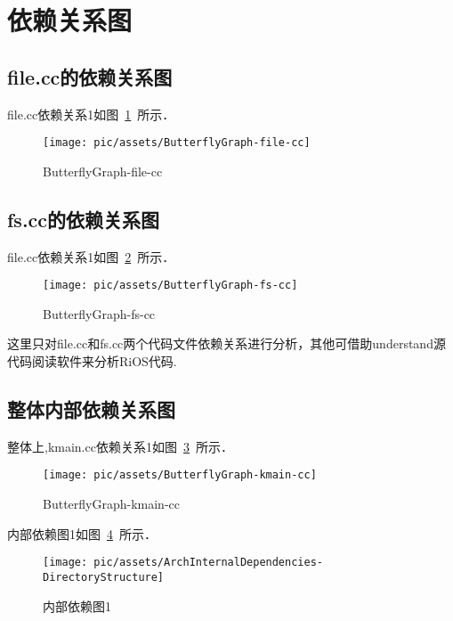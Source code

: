 \section{依赖关系图}

\subsection{file.cc的依赖关系图}
file.cc依赖关系1如图~\ref{ButterflyGraph-file-cc}~所示．	

     \begin{figure}[!htbp]
            \centering	\texttt{[image: pic/assets/ButterflyGraph-file-cc]}
            \caption{ButterflyGraph-file-cc}	\label{ButterflyGraph-file-cc}	\end{figure} 
          

\subsection{fs.cc的依赖关系图}
file.cc依赖关系1如图~\ref{ButterflyGraph-fs-cc}~所示．	

     \begin{figure}[!htbp]
            \centering	\texttt{[image: pic/assets/ButterflyGraph-fs-cc]}
            \caption{ButterflyGraph-fs-cc}	\label{ButterflyGraph-fs-cc}	\end{figure} 

这里只对file.cc和fs.cc两个代码文件依赖关系进行分析，其他可借助understand源代码阅读软件来分析RiOS代码.            

\subsection{整体内部依赖关系图}


整体上,kmain.cc依赖关系1如图~\ref{ButterflyGraph-kmain-cc}~所示．	

     \begin{figure}[!htbp]
            \centering	\texttt{[image: pic/assets/ButterflyGraph-kmain-cc]}
            \caption{ButterflyGraph-kmain-cc}	\label{ButterflyGraph-kmain-cc}	\end{figure} 


内部依赖图1如图~\ref{ArchInternalDependencies-DirectoryStructure}~所示．	

     \begin{figure}[!htbp]
            \centering	\texttt{[image: pic/assets/ArchInternalDependencies-DirectoryStructure]}
            \caption{内部依赖图1}	\label{ArchInternalDependencies-DirectoryStructure}	\end{figure} 

